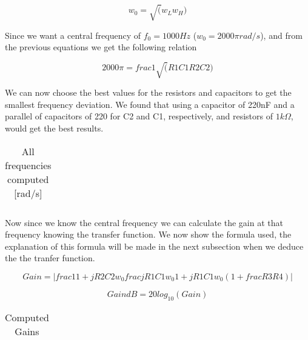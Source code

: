 \begin{equation}
	w_{0} = \sqrt(w_L w_H)
\end{equation}

\Par Since we want a central frequency of $f_0 = 1000 Hz$ ($w_0 = 2000\pi rad/s$), and from the previous equations we get the following relation

\begin{equation}
	2000\pi = frac{1}{\sqrt(R1C1R2C2)}
\end{equation}

\par We can now choose the best values for the resistors and capacitors to get the smallest frequency deviation. We found that using a capacitor of 220nF and a parallel of capacitors of 220 for C2 and C1, respectively, and resistors of $1k\Omega$, would get the best results.

\vspace{5mm}
\begin{table}[H]
	\centering
	\begin{tabularx}{0.9\textwidth} {
 	    | >{\raggedright\arraybackslash}X
  	    | >{\raggedleft\arraybackslash}X | }
	\hline
	
	\end{tabularx}
	\caption{All frequencies computed [rad/s]}
	\label{tab:currents}
\end{table}
\vspace{5mm}

\par Now since we know the central frequency we can calculate the gain at that frequency knowing the transfer function. We now show the formula used, the explanation of this formula will be made in the next subsection when we deduce the the tranfer function.

\begin{equation}
	Gain = |frac{1}{1 + j R2 C2 w_0} frac{j R1 C1 w_0}{1 + j R1 C1 w_0} (1 + frac{R3}{R4})| 
\end{equation}

\begin{equation}
	Gain dB = 20 log_{10}(Gain)
\end{equation}

\vspace{5mm}
\begin{table}[H]
	\centering
	\begin{tabularx}{0.9\textwidth} {
 	    | >{\raggedright\arraybackslash}X
  	    | >{\raggedleft\arraybackslash}X | }
	\hline
	
	\end{tabularx}
	\caption{Computed Gains}
	\label{tab:currents}
\end{table}
\vspace{5mm}
 
